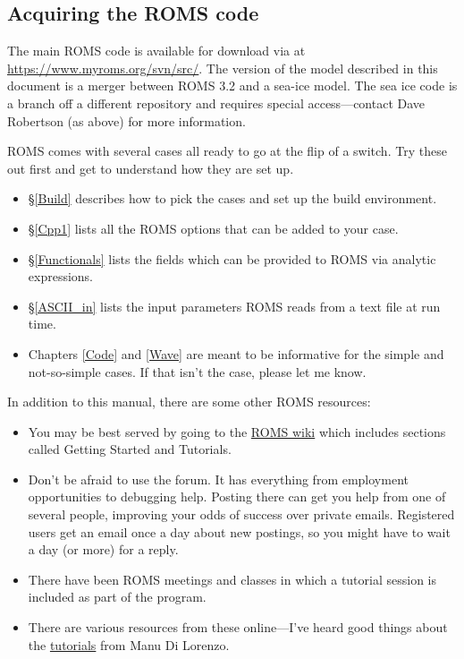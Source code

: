 \subsection{Acquiring the ROMS code}
The main ROMS code is available for download via  at
\href{https://www.myroms.org/svn/src/}{https://www.myroms.org/svn/src/}.
The version of the model described in this document is a merger between
ROMS 3.2 and a sea-ice model.
The sea ice code is a branch off a different repository and requires
special access---contact Dave Robertson (as above) for more information.

ROMS comes with several cases all ready to go at the flip
of a switch. Try these out first and get to understand how they
are set up.
    \begin{itemize}
      \item \S\ref{Build} describes how to pick the cases and set up
      the build environment.
      \item \S\ref{Cpp1} lists all the ROMS options that can be
      added to your case.
      \item \S\ref{Functionals} lists the fields which can be
      provided to ROMS via analytic expressions.
      \item \S\ref{ASCII_in} lists the input parameters ROMS reads
      from a text file at run time.
      \item Chapters \ref{Code} and \ref{Wave} are meant to be
      informative for the simple and not-so-simple cases. If that
      isn't the case, please let me know.
    \end{itemize}
In addition to this manual, there are some other ROMS resources:
\begin{itemize}
   \item You may be best served by going to the 
\href{https://www.myroms.org/wiki/}{ROMS wiki} which includes
sections called Getting Started and Tutorials.
   \item Don't be afraid to use the forum. It has everything from
employment opportunities to debugging help. Posting there can get
you help from one of several people, improving your odds of success
over private emails. Registered users get an email once a day about
new postings, so you might have to wait a day (or more) for a reply.
   \item There have been ROMS meetings and classes in which a tutorial
session is included as part of the program.
   \item There are various resources
from these online---I've heard good things about the
\href{http://eros.eas.gatech.edu/ROMS-Tutorial/tutorials.html}{tutorials}
from Manu Di Lorenzo.
\end{itemize}

